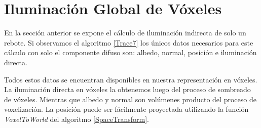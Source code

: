 \section{Iluminación Global de Vóxeles} %
\label{sec:iluminacion_global_de_voxeles}
En la sección anterior se expone el cálculo de iluminación indirecta de solo un rebote. Si observamos el algoritmo \ref{Trace7} los únicos datos necesarios para este cálculo con solo el componente difuso son: albedo, normal, posición e iluminación directa.

Todos estos datos se encuentran disponibles en nuestra representación en vóxeles. La iluminación directa en vóxeles la obtenemos luego del proceso de sombreado de vóxeles. Mientras que albedo y normal son volúmenes producto del proceso de voxelización. La posición puede ser fácilmente proyectada utilizando la función \emph{VoxelToWorld} del algoritmo \ref{SpaceTransform}.

